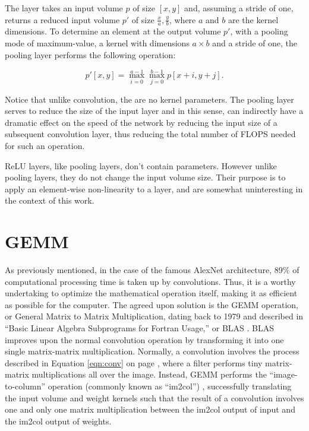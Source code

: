 The layer takes an input volume $p$ of size $[x,y]$ and, assuming a stride of one, returns a reduced input volume $p'$ of size $\frac{x}{a},\frac{y}{b}$, where $a$ and $b$ are the kernel dimensions. To determine an element at the output volume $p'$, with a pooling mode of maximum-value, a kernel with dimensions $a\times b$ and a stride of one, the pooling layer performs the following operation:

\begin{equation}
\label{eqn:pool}
p'[x,y] = \max_{i=0}^{a-1}\max_{j=0}^{b-1}{p[x+i,y+j]}.
\end{equation}

Notice that unlike convolution, the are no kernel parameters. The pooling layer serves to reduce the size of the input layer and in this sense, can indirectly have a dramatic effect on the speed of the network by reducing the input size of a subsequent convolution layer, thus reducing the total number of FLOPS needed for such an operation.

ReLU layers, like pooling layers, don't contain parameters. However unlike pooling layers, they do not change the input volume size. Their purpose is to apply an element-wise non-linearity to a layer, and are somewhat uninteresting in the context of this work.

\section{GEMM}
As previously mentioned, in the case of the famous AlexNet architecture, 89\% of computational processing time is taken up by convolutions. Thus, it is a worthy undertaking to optimize the mathematical operation itself, making it as efficient as possible for the computer. The agreed upon solution is the GEMM operation, or General Matrix to Matrix Multiplication, dating back to 1979 and described in ``Basic Linear Algebra Subprograms for Fortran Usage,'' or BLAS \cite{BLAS}. BLAS improves upon the normal convolution operation by transforming it into one single matrix-matrix multiplication. Normally, a convolution involves the process described in Equation \ref{eqn:conv} on page \pageref{eqn:conv}, where a filter performs tiny matrix-matrix multiplications all over the image. Instead, GEMM performs the ``image-to-column'' operation (commonly known as ``im2col'') \cite{im2col}, successfully translating the input volume and weight kernels such that the result of a convolution involves one and only one matrix multiplication between the im2col output of input and the im2col output of weights.

